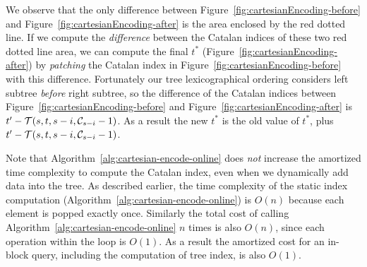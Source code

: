 We observe that the only difference between
Figure~\ref{fig:cartesianEncoding-before} and
Figure~\ref{fig:cartesianEncoding-after} is the area enclosed by the
red dotted line.  If we compute the {\em difference} between the
Catalan indices of these two red dotted line area, we can compute the
final $t^*$ (Figure~\ref{fig:cartesianEncoding-after}) by {\em
  patching} the Catalan index in
Figure~\ref{fig:cartesianEncoding-before} with this difference.
Fortunately our tree lexicographical ordering considers left subtree
{\em before} right subtree, so the difference of the Catalan indices
between Figure~\ref{fig:cartesianEncoding-before} and
Figure~\ref{fig:cartesianEncoding-after} is $t' - {\cal T}(s, t, s -
i, {\cal C}_{s-i} - 1)$.  As a result the new $t^*$ is the old value
of $t^*$, plus $t' - {\cal T}(s, t, s - i, {\cal C}_{s-i} - 1)$.

Note that Algorithm~\ref{alg:cartesian-encode-online} does {\em not}
increase the amortized time complexity to compute the Catalan index,
even when we dynamically add data into the tree.  As described
earlier, the time complexity of the static index computation
(Algorithm~\ref{alg:cartesian-encode-online}) is $O(n)$ because each
element is popped exactly once.  Similarly the total cost of calling
Algorithm~\ref{alg:cartesian-encode-online} $n$ times is also $O(n)$,
since each operation within the loop is $O(1)$.  As a result the
amortized cost for an in-block query, including the computation of
tree index, is also $O(1)$.
